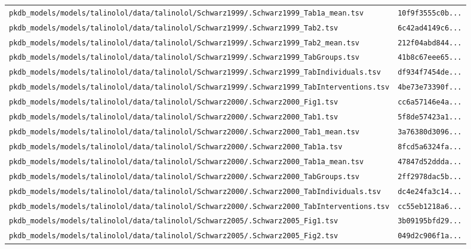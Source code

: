\documentclass{article}
\begin{document}
\begin{longtable}{ll}
\texttt{pkdb\_models/models/talinolol/data/talinolol/Schwarz1999/.Schwarz1999\_Tab1a\_mean.tsv} & \texttt{10f9f3555c0b...} \\
\texttt{pkdb\_models/models/talinolol/data/talinolol/Schwarz1999/.Schwarz1999\_Tab2.tsv} & \texttt{6c42ad4149c6...} \\
\texttt{pkdb\_models/models/talinolol/data/talinolol/Schwarz1999/.Schwarz1999\_Tab2\_mean.tsv} & \texttt{212f04abd844...} \\
\texttt{pkdb\_models/models/talinolol/data/talinolol/Schwarz1999/.Schwarz1999\_TabGroups.tsv} & \texttt{41b8c67eee65...} \\
\texttt{pkdb\_models/models/talinolol/data/talinolol/Schwarz1999/.Schwarz1999\_TabIndividuals.tsv} & \texttt{df934f7454de...} \\
\texttt{pkdb\_models/models/talinolol/data/talinolol/Schwarz1999/.Schwarz1999\_TabInterventions.tsv} & \texttt{4be73e73390f...} \\
\texttt{pkdb\_models/models/talinolol/data/talinolol/Schwarz2000/.Schwarz2000\_Fig1.tsv} & \texttt{cc6a57146e4a...} \\
\texttt{pkdb\_models/models/talinolol/data/talinolol/Schwarz2000/.Schwarz2000\_Tab1.tsv} & \texttt{5f8de57423a1...} \\
\texttt{pkdb\_models/models/talinolol/data/talinolol/Schwarz2000/.Schwarz2000\_Tab1\_mean.tsv} & \texttt{3a76380d3096...} \\
\texttt{pkdb\_models/models/talinolol/data/talinolol/Schwarz2000/.Schwarz2000\_Tab1a.tsv} & \texttt{8fcd5a6324fa...} \\
\texttt{pkdb\_models/models/talinolol/data/talinolol/Schwarz2000/.Schwarz2000\_Tab1a\_mean.tsv} & \texttt{47847d52ddda...} \\
\texttt{pkdb\_models/models/talinolol/data/talinolol/Schwarz2000/.Schwarz2000\_TabGroups.tsv} & \texttt{2ff2978dac5b...} \\
\texttt{pkdb\_models/models/talinolol/data/talinolol/Schwarz2000/.Schwarz2000\_TabIndividuals.tsv} & \texttt{dc4e24fa3c14...} \\
\texttt{pkdb\_models/models/talinolol/data/talinolol/Schwarz2000/.Schwarz2000\_TabInterventions.tsv} & \texttt{cc55eb1218a6...} \\
\texttt{pkdb\_models/models/talinolol/data/talinolol/Schwarz2005/.Schwarz2005\_Fig1.tsv} & \texttt{3b09195bfd29...} \\
\texttt{pkdb\_models/models/talinolol/data/talinolol/Schwarz2005/.Schwarz2005\_Fig2.tsv} & \texttt{049d2c906f1a...} \\

\end{longtable}
\end{document}

